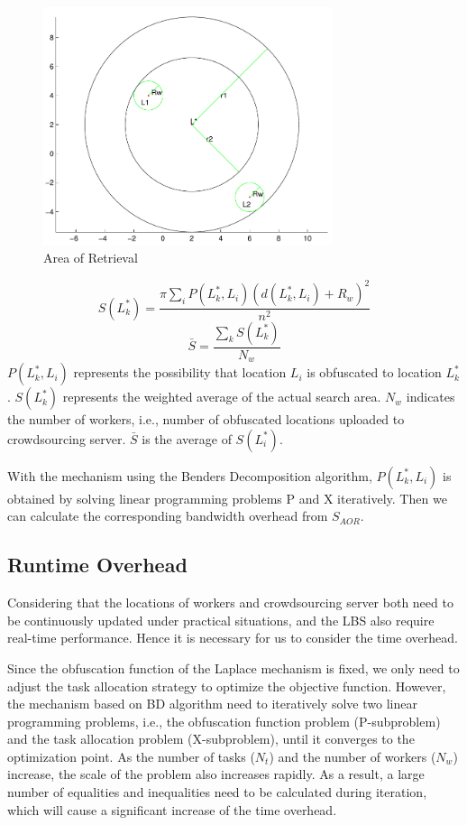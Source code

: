 \begin{figure}
\includegraphics[width=8.5cm]{AOR}
\caption{Area of Retrieval}
\label{img:AOR}
\end{figure}

$$
	S(L^*_k)=\frac{\pi \sum_i P(L^*_k,L_i)(d(L^*_k,L_i)+R_w)^2}{n^2}
$$
$$
	\bar{S}=\frac{\sum_k S(L^*_k)}{N_w}
$$
$P(L^*_k,L_i)$ represents the possibility that location $L_i$ is obfuscated to location $L^*_k$. $S(L^*_k)$ represents the weighted average of the actual search area. $N_w$ indicates the number of workers, i.e., number of obfuscated locations uploaded to crowdsourcing server. $\bar{S}$ is the average of $S(L^*_i)$. 

With the mechanism using the Benders Decomposition algorithm, $P(L^*_k,L_i)$ is obtained by solving linear programming problems P and X iteratively. Then we can calculate the corresponding bandwidth overhead from $S_{AOR}$. 

\subsection{Runtime Overhead} %
Considering that the locations of workers and crowdsourcing server both need to be continuously updated under practical situations, and the LBS also require real-time performance. Hence it is necessary for us to consider the time overhead.

Since the obfuscation function of the Laplace mechanism is fixed, we only need to adjust the task allocation strategy to optimize the objective function. However, the mechanism based on BD algorithm need to iteratively solve two linear programming problems, i.e., the obfuscation function problem (P-subproblem) and the task allocation problem (X-subproblem), until it converges to the optimization point. As the number of tasks ($N_t$) and the number of workers ($N_w$) increase, the scale of the problem also increases rapidly. As a result, a large number of equalities and inequalities need to be calculated during iteration, which will cause a significant increase of the time overhead.

